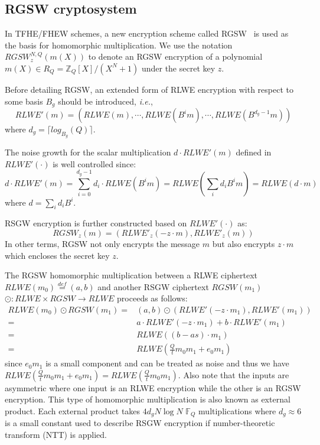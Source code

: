 \documentclass{iacrtrans}
\theoremstyle{plain}
\begin{document}
\subsection{RGSW cryptosystem}
In TFHE/FHEW schemes, a new encryption scheme called RGSW~\cite{gentry2013homomorphic} is used as the basis for homomorphic multiplication. We use the notation $RGSW_z^{N,Q}(m(X))$ to denote an RGSW encryption of a polynomial $m(X)\in R_Q=\mathbb{Z}_Q[X]/(X^N+1)$ under the secret key $z$. 

Before detailing RGSW, an extended form of RLWE encryption with respect to some basis $B_g$ should be introduced, \textit{i.e.},
\[
RLWE'(m)=(RLWE(m), \cdots, RLWE(B^im), \cdots, RLWE(B^{d_g-1}m))
\] 
where $d_g=\lceil log_{B_g}(Q)\rceil$.

The noise growth for the scalar multiplication $d\cdot RLWE'(m)$ defined in $RLWE'(\cdot)$ is well controlled since:
\[
    d\cdot RLWE'(m) = \sum_{i=0}^{d_g-1} d_i\cdot RLWE(B^im) =RLWE(\sum_i d_iB^im)=RLWE(d\cdot m)
\]
where $d=\sum_i d_iB^i$.


RSGW encryption is further constructed based on $RLWE'(\cdot)$ as:
\[
RGSW_z(m)=(RLWE'_z(-z\cdot m),RLWE'_z(m))
\]
In other terms, RGSW not only encrypts the message $m$ but also encrypts $z\cdot m$ which encloses the secret key $z$.

The RGSW homomorphic multiplication between a RLWE ciphertext $RLWE(m_0)\overset{def}{=}(a,b)$ and another RSGW ciphertext $RGSW(m_1)$
 $\odot: RLWE\times RGSW\to RLWE$ proceeds as follows:
\begin{align*}
    RLWE(m_0)\odot RGSW(m_1) = &  (a,b)\odot (RLWE'(-z\cdot m_1), RLWE'(m_1)) \\
                             = & a\cdot RLWE'(-z\cdot m_1) + b\cdot RLWE'(m_1) \\
                             = & RLWE((b-as)\cdot m_1)\\
                             = & RLWE(\frac{Q}{t}m_0m_1+ e_0m_1)
\end{align*}
since $e_0m_1$ is a small component and can be treated as noise and thus we have $RLWE(\frac{Q}{t}m_0m_1+ e_0m_1)=RLWE(\frac{Q}{t}m_0m_1)$. Also note that the inputs are asymmetric where one input is an RLWE encryption while the other is an RGSW encryption. 
This type of homomorphic multiplication is also known as external product. 
Each external product takes $4d_gN \log N$ $\mathbb{F}_Q$ multiplications where $d_g\approx 6$ is a small constant used to describe RSGW encryption if number-theoretic transform (NTT) is applied.
\end{document}
